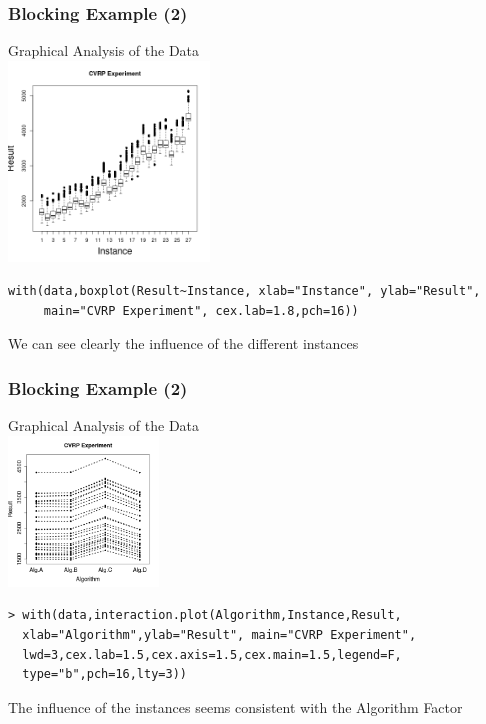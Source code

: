 \documentclass[10pt]{beamer}
\begin{document}
\begin{frame}
  \frametitle{Blocking Example (2)}
  \begin{center}
    Graphical Analysis of the Data\\
    \includegraphics[width=0.4\textwidth]{img/cvrp2}
  \end{center}
{\small
\begin{verbatim}
with(data,boxplot(Result~Instance, xlab="Instance", ylab="Result", 
     main="CVRP Experiment", cex.lab=1.8,pch=16))
\end{verbatim}}
\begin{block}{}
  We can see clearly the influence of the different instances
\end{block}
\end{frame}

\begin{frame}
  \frametitle{Blocking Example (2)}
  \begin{center}
    Graphical Analysis of the Data\\
    \includegraphics[width=0.3\textwidth]{img/cvrp3}
  \end{center}
{\small
\begin{verbatim}
> with(data,interaction.plot(Algorithm,Instance,Result,
  xlab="Algorithm",ylab="Result", main="CVRP Experiment",
  lwd=3,cex.lab=1.5,cex.axis=1.5,cex.main=1.5,legend=F,
  type="b",pch=16,lty=3))
\end{verbatim}}
\begin{block}{}
  The influence of the instances seems consistent with the Algorithm Factor
\end{block}
\end{frame}
\end{document}
